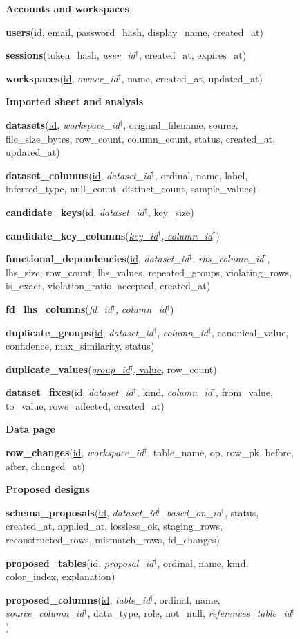 \newcommand{\rk}[1]{\underline{#1}}
\newcommand{\rf}[1]{\textit{#1}$^{\dagger}$}
\newcommand{\rel}[2]{\noindent\textbf{#1}(#2)\par\smallskip}
\begin{figure}[htbp]
\footnotesize{}\raggedright
\begin{minipage}[t]{0.49\linewidth}\raggedright
\textsf{\textbf{Accounts and workspaces}}\par\smallskip
\rel{users}{\rk{id}, email, password\_hash, display\_name, created\_at}
\rel{sessions}{\rk{token\_hash}, \rf{user\_id}, created\_at, expires\_at}
\rel{workspaces}{\rk{id}, \rf{owner\_id}, name, created\_at, updated\_at}
\textsf{\textbf{Imported sheet and analysis}}\par\smallskip
\rel{datasets}{\rk{id}, \rf{workspace\_id}, original\_filename, source, file\_size\_bytes, row\_count, column\_count, status, created\_at, updated\_at}
\rel{dataset\_columns}{\rk{id}, \rf{dataset\_id}, ordinal, name, label, inferred\_type, null\_count, distinct\_count, sample\_values}
\rel{candidate\_keys}{\rk{id}, \rf{dataset\_id}, key\_size}
\rel{candidate\_key\_columns}{\rk{\rf{key\_id}, \rf{column\_id}}}
\rel{functional\_dependencies}{\rk{id}, \rf{dataset\_id}, \rf{rhs\_column\_id}, lhs\_size, row\_count, lhs\_values, repeated\_groups, violating\_rows, is\_exact, violation\_ratio, accepted, created\_at}
\rel{fd\_lhs\_columns}{\rk{\rf{fd\_id}, \rf{column\_id}}}
\rel{duplicate\_groups}{\rk{id}, \rf{dataset\_id}, \rf{column\_id}, canonical\_value, confidence, max\_similarity, status}
\rel{duplicate\_values}{\rk{\rf{group\_id}, value}, row\_count}
\rel{dataset\_fixes}{\rk{id}, \rf{dataset\_id}, kind, \rf{column\_id}, from\_value, to\_value, rows\_affected, created\_at}
\textsf{\textbf{Data page}}\par\smallskip
\rel{row\_changes}{\rk{id}, \rf{workspace\_id}, table\_name, op, row\_pk, before, after, changed\_at}
\end{minipage}\hfill
\begin{minipage}[t]{0.49\linewidth}\raggedright
\textsf{\textbf{Proposed designs}}\par\smallskip
\rel{schema\_proposals}{\rk{id}, \rf{dataset\_id}, \rf{based\_on\_id}, status, created\_at, applied\_at, lossless\_ok, staging\_rows, reconstructed\_rows, mismatch\_rows, fd\_changes}
\rel{proposed\_tables}{\rk{id}, \rf{proposal\_id}, ordinal, name, kind, color\_index, explanation}
\rel{proposed\_columns}{\rk{id}, \rf{table\_id}, ordinal, name, \rf{source\_column\_id}, data\_type, role, not\_null, \rf{references\_table\_id}}

\end{minipage}
\end{figure}
